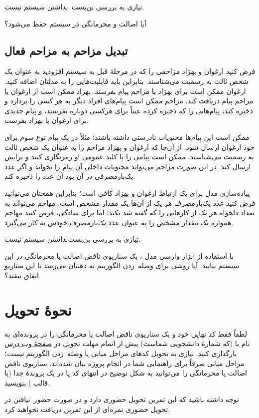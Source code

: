 \documentclass[a4paper]{article}
\begin{document}
نیازی به بررسی بن‌بست~نداشتن سیستم نیست.

آیا اصالت و محرمانگی در سیستم حفظ می‌شود؟

\subsection{تبدیل مزاحم به مزاحم فعال}

فرض کنید ارغوان و بهزاد مزاحمی را که در مرحلهٔ قبل به سیستم افزودید به عنوان یک شخص ثالث به رسمیت می‌شناسند.
بنابراین باید قابلیت‌هایی را به مدلتان اضافه کنید.
ارغوان ممکن است برای بهزاد یا مزاحم پیام بفرستد.
بهزاد ممکن است از ارغوان یا مزاحم پیام دریافت کند.
مزاحم ممکن است
پیام‌های افراد دیگر به هر کسی را بردارد و ذخیره کند،
پیام‌هایی را که ذخیره کرده عیناً برای هرکسی دوباره بفرستد،
و
پیام جدیدی برای ارغوان یا بهزاد بفرست.

ممکن است این پیام‌ها محتویات نادرستی داشته باشند؛ مثلاً  در یک پیام نوع سوم برای خود ارغوان ارسال شود.
از آن‌جا که ارغوان و بهزاد مزاحم را به عنوان یک شخص ثالث به رسمیت می‌شناسند،
ممکن است پیامی را با کلید عمومی او رمزنگاری کنند و برایش ارسال کند.
در این صورت مزاحم می‌تواند محتویات داخلی آن پیام را بخواند و اگر عدد یک‌بارمصرفی در آن بود آن عدد را ذخیره کند.

پیاده‌سازی مدل برای یک ارتباط ارغوان و بهزاد کافی است؛
بنابراین همچنان می‌توانید فرض کنید عدد یک‌بارمصرف هر یک از آن‌ها یک مقدار مشخص است.
مهاجم می‌تواند به تعداد دلخواه هر یک از کارهایی را که گفته شد بکند؛
اما برای سادگی، فرض کنید مهاجم همواره یک مقدار مشخص را به عنوان عدد یک‌بارمصرف خودش به کار می‌گیرد.

نیازی به بررسی بن‌بست‌نداشتن سیستم نیست.

با استفاده از ابزار وارسی مدل ، یک سناریوی ناقض اصالت یا محرمانگی در این سیستم بیابید.
آیا روشی برای وصله~زدن الگوریتم به ذهنتان می‌رسد تا این سناریو اتفاق نیفتد؟

\section*{نحوهٔ تحویل}

لطفاً فقط کد نهایی خود و یک سناریوی ناقض اصالت یا محرمانگی را در پرونده‌ای به نام  یا  (که  شمارهٔ دانشجویی شماست) پیش از اتمام مهلت تحویل در \href{https://cecm.ut.ac.ir/course/view.php?id=2809}{صفحهٔ وب درس} بارگذاری کنید.
نیازی به تحویل کدهای مراحل میانی یا وصله~زدن الگوریتم \textit{نیست}؛ مراحل میانی صرفاً برای راهنمایی شما در انجام پروژه بیان شده‌اند.
سناریوی ناقض اصالت یا محرمانگی را می‌توانید به شکل توضیح در انتهای کد یا در یک پروندهٔ جدا (با قالب ) بنویسید.

توجه داشته باشید که این تمرین تحویل حضوری دارد و در صورت حضور~نیافتن در تحویل حضوری نمره‌ای از این تمرین دریافت نخواهید کرد.
 
\end{document}
